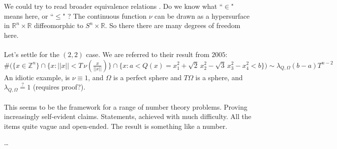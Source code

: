 \documentclass[12pt]{article}
\begin{document}
We could try to read broader equivalence relations .  Do we know what ``$ \in $" means here, or ``$\leq$" ?  The continuous function $\nu$ can be drawn as a hypersurface in $\mathbb{R}^n \times \mathbb{R}$ diffeomorphic to $S^n \times \mathbb{R}$.  So there there are many  degrees of freedom here.  \\ \\
Let's settle for the $(2,2)$ case.  We are referred to their result from $2005$: 
$$ \# \Big(  \big\{ x \in \mathbb{Z}^n   \big\} \cap \big\{ x : ||x|| < T\, \nu( \tfrac{x}{||x||})  \big\} \cap \big\{ x:  a < Q(x)= x_1^2 + \sqrt{2}\,x_2^2 - \sqrt{3}\,x_3^2 - x_4^2 < b \big\} \Big)   \sim \lambda_{Q, \Omega} (b-a)T^{n-2} $$
An idiotic example, is $\nu \equiv 1$, and $\Omega$ is a perfect sphere and $T\Omega$ is a sphere, and $\lambda_{Q, \Omega} \stackrel{?}{=}1$ (requires proof?).  \\ \\
This seems to be the framework for a range of number theory problems.  Proving increasingly self-evident claims.  Statements, achieved with much difficulty.  All the items quite vague and open-ended.  The result is something like a number.


\vfill



\begin{thebibliography}{}

\item \dots 

\end{thebibliography}
\end{document}
